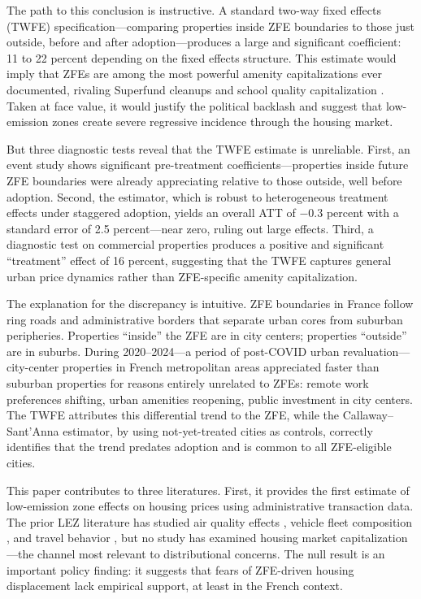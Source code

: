 \documentclass[12pt]{article}
\begin{document}
The path to this conclusion is instructive. A standard two-way fixed effects (TWFE) specification---comparing properties inside ZFE boundaries to those just outside, before and after adoption---produces a large and significant coefficient: 11 to 22 percent depending on the fixed effects structure. This estimate would imply that ZFEs are among the most powerful amenity capitalizations ever documented, rivaling Superfund cleanups \citep{greenstone2009identifying} and school quality capitalization \citep{black1999better}. Taken at face value, it would justify the political backlash and suggest that low-emission zones create severe regressive incidence through the housing market.

But three diagnostic tests reveal that the TWFE estimate is unreliable. First, an event study shows significant pre-treatment coefficients---properties inside future ZFE boundaries were already appreciating relative to those outside, well before adoption. Second, the \citet{callaway2021difference} estimator, which is robust to heterogeneous treatment effects under staggered adoption, yields an overall ATT of $-0.3$ percent with a standard error of 2.5 percent---near zero, ruling out large effects. Third, a diagnostic test on commercial properties produces a positive and significant ``treatment'' effect of 16 percent, suggesting that the TWFE captures general urban price dynamics rather than ZFE-specific amenity capitalization.

The explanation for the discrepancy is intuitive. ZFE boundaries in France follow ring roads and administrative borders that separate urban cores from suburban peripheries. Properties ``inside'' the ZFE are in city centers; properties ``outside'' are in suburbs. During 2020--2024---a period of post-COVID urban revaluation---city-center properties in French metropolitan areas appreciated faster than suburban properties for reasons entirely unrelated to ZFEs: remote work preferences shifting, urban amenities reopening, public investment in city centers. The TWFE attributes this differential trend to the ZFE, while the Callaway--Sant'Anna estimator, by using not-yet-treated cities as controls, correctly identifies that the trend predates adoption and is common to all ZFE-eligible cities.

This paper contributes to three literatures. First, it provides the first estimate of low-emission zone effects on housing prices using administrative transaction data. The prior LEZ literature has studied air quality effects \citep{gehrsitz2017effect, holman2015where}, vehicle fleet composition \citep{wolff2014keep}, and travel behavior \citep{green2020low}, but no study has examined housing market capitalization---the channel most relevant to distributional concerns. The null result is an important policy finding: it suggests that fears of ZFE-driven housing displacement lack empirical support, at least in the French context.
\end{document}
